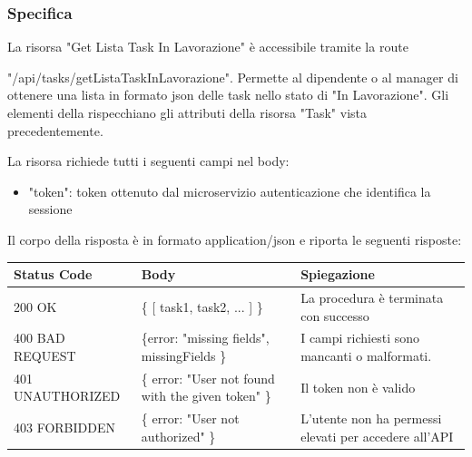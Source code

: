 \documentclass{report}
\begin{document}
\subsubsection*{Specifica}

La risorsa "Get Lista Task In Lavorazione" è accessibile tramite la route

"/api/tasks/getListaTaskInLavorazione". Permette al dipendente o al manager di ottenere una lista in formato json delle task nello stato di "In Lavorazione". Gli elementi della rispecchiano gli attributi della risorsa "Task" vista precedentemente.

La risorsa richiede tutti i seguenti campi nel body:
\begin{itemize}
	\item "token": token ottenuto dal microservizio autenticazione che identifica la sessione
\end{itemize}

Il corpo della risposta è in formato application/json e riporta le seguenti risposte:

\begin{center} %
	\centering
	\begin{tabular}{ |p{4cm}|p{4cm}|p{4cm}| }
		\hline
		\centering Status Code & \qquad\qquad\quad Body                             & \qquad\quad Spiegazione                               \\ %
		\hline
		200 OK                 & \{ [ task1, task2, ... ] \}                        & La procedura è terminata con successo                 \\
		\hline
		400 BAD REQUEST        & \{error: "missing fields", missingFields \}        & I campi richiesti sono mancanti o malformati.         \\
		\hline
		401 UNAUTHORIZED       & \{ error: "User not found with the given token" \} & Il token non è valido                                 \\
		\hline
		403 FORBIDDEN          & \{ error: "User not authorized" \}                 & L'utente non ha permessi elevati per accedere all'API \\
		\hline
	\end{tabular}
\end{center}
\end{document}

